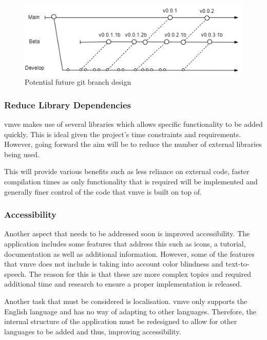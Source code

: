 \documentclass[11pt]{article}
\begin{document}
\begin{figure}[H]
  \centering
  \includegraphics[width=\textwidth]{images/future_branch_design.png}
  \caption{Potential future git branch design}
  \label{fig:futurebrancharch}
\end{figure}

\subsubsection{Reduce Library Dependencies}
\gls*{vmve} makes use of several libraries which allows specific functionality to
be added quickly. This is ideal given the project's time constraints and
requirements. However, going forward the aim will be to reduce the number of
external libraries being used.

This will provide various benefits such as less reliance on external code,
faster compilation times as only functionality that is required will be
implemented and generally finer control of the code that \gls*{vmve} is built on
top of.

\subsubsection{Accessibility}
Another aspect that needs to be addressed soon is improved accessibility. The
application includes some features that address this such as icons, a tutorial,
documentation as well as additional information. However, some of the features
that \gls*{vmve} does not include is taking into account color blindness and
text-to-speech. The reason for this is that these are more complex topics and
required additional time and research to ensure a proper implementation is
released.

Another task that must be considered is localisation. \gls*{vmve} only supports
the English language and has no way of adapting to other languages. Therefore,
the internal structure of the application must be redesigned to allow for
other languages to be added and thus, improving accessibility.
\end{document}

